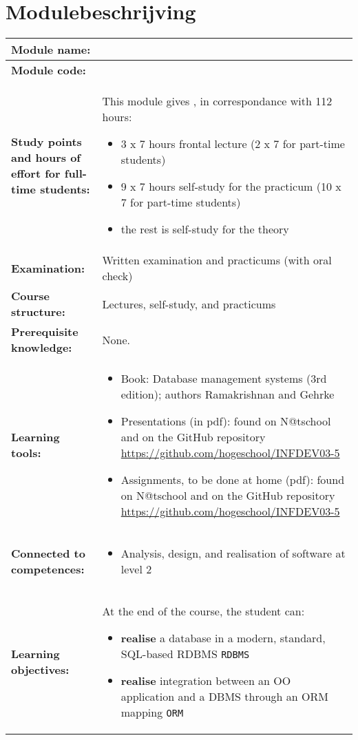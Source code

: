 \section*{Modulebeschrijving}
\begin{tabularx}{\textwidth}{|>{\columncolor{lichtGrijs}} p{}|X|}
	\hline
	\textbf{Module name:} & \modulenaam\\
	\hline
	\textbf{Module code: }& \modulecode\\
	\hline
	\textbf{Study points \newline and hours of effort for full-time students:} & This module gives \stdPunten, in correspondance with 112 hours:
	\begin{itemize}
		\item 3 x 7 hours frontal lecture (2 x 7 for part-time students)
		\item 9 x 7 hours self-study for the practicum (10 x 7 for part-time students)
		\item the rest is self-study for the theory
	\end{itemize} \\
	\hline
	\textbf{Examination:} & Written examination and practicums (with oral check) \\
	\hline
	\textbf{Course structure:} & Lectures, self-study, and practicums \\
	\hline
	\textbf{Prerequisite knowledge:} & None. \\
	\hline
	\textbf{Learning tools:}  &
		\begin{itemize}
			\item Book: Database management systems (3rd edition); authors Ramakrishnan and Gehrke
			\item Presentations (in pdf): found on N@tschool and on the GitHub repository \url{https://github.com/hogeschool/INFDEV03-5}
			\item Assignments, to be done at home (pdf): found on N@tschool and on the GitHub repository \url{https://github.com/hogeschool/INFDEV03-5}
		\end{itemize} \\
	\hline
	\textbf{Connected to \newline competences:} &
		\begin{itemize}
			\item Analysis, design, and realisation of software at level 2
		\end{itemize} \\
	\hline
	\textbf{Learning objectives:} &
		At the end of the course, the student can:
			\begin{itemize}
				\item \textbf{realise} a database in a modern, standard, SQL-based RDBMS \texttt{RDBMS}
				\item \textbf{realise} integration between an OO application and a DBMS through an ORM mapping \texttt{ORM}


\end{itemize}
\end{tabularx}
